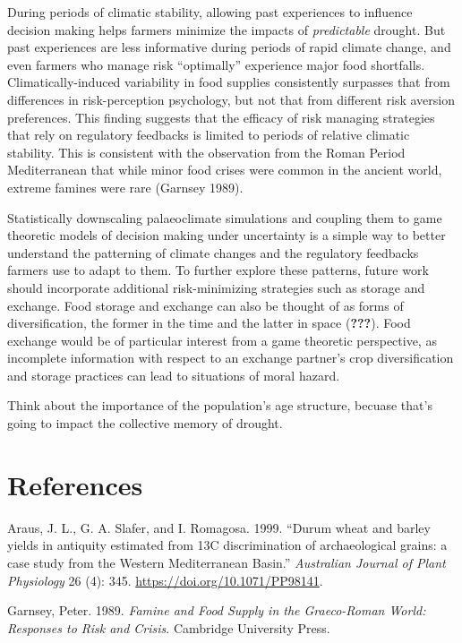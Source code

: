 \documentclass[smallextended]{svjour3}       %
\begin{document}
During periods of climatic stability, allowing past experiences to
influence decision making helps farmers minimize the impacts of
\emph{predictable} drought. But past experiences are less informative
during periods of rapid climate change, and even farmers who manage risk
``optimally'' experience major food shortfalls. Climatically-induced
variability in food supplies consistently surpasses that from
differences in risk-perception psychology, but not that from different
risk aversion preferences. This finding suggests that the efficacy of
risk managing strategies that rely on regulatory feedbacks is limited to
periods of relative climatic stability. This is consistent with the
observation from the Roman Period Mediterranean that while minor food
crises were common in the ancient world, extreme famines were rare
(Garnsey 1989).

Statistically downscaling palaeoclimate simulations and coupling them to
game theoretic models of decision making under uncertainty is a simple
way to better understand the patterning of climate changes and the
regulatory feedbacks farmers use to adapt to them. To further explore
these patterns, future work should incorporate additional
risk-minimizing strategies such as storage and exchange. Food storage
and exchange can also be thought of as forms of diversification, the
former in the time and the latter in space ({\textbf{???}}). Food
exchange would be of particular interest from a game theoretic
perspective, as incomplete information with respect to an exchange
partner's crop diversification and storage practices can lead to
situations of moral hazard.

Think about the importance of the population's age structure, becuase
that's going to impact the collective memory of drought.

\hypertarget{references}{%
\section*{References}\label{references}}

\hypertarget{refs}{}
\leavevmode\hypertarget{ref-Slafer1999}{}%
Araus, J. L., G. A. Slafer, and I. Romagosa. 1999. ``Durum wheat and
barley yields in antiquity estimated from 13C discrimination of
archaeological grains: a case study from the Western Mediterranean
Basin.'' \emph{Australian Journal of Plant Physiology} 26 (4): 345.
\url{https://doi.org/10.1071/PP98141}.

\leavevmode\hypertarget{ref-Garnsey1989}{}%
Garnsey, Peter. 1989. \emph{Famine and Food Supply in the Graeco-Roman
World: Responses to Risk and Crisis}. Cambridge University Press.
\end{document}
